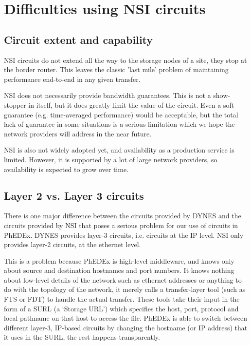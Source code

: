 \section{Difficulties using NSI circuits}

\subsection{Circuit extent and capability}
NSI circuits do not extend all the way to the storage nodes of a site, they stop at the border router. This leaves the classic 'last mile' problem of maintaining performance end-to-end in any given transfer.

NSI does not necessarily provide bandwidth guarantees. This is not a show-stopper in itself, but it does greatly limit the value of the circuit. Even a soft guarantee (e.g. time-averaged performance) would be acceptable\cite{BW_sharing}, but the total lack of guarantee in some situations is a serious limitation which we hope the network providers will address in the near future.

NSI is also not widely adopted yet, and availability as a production service is limited. However, it is supported by a lot of large network providers, so availability is expected to grow over time.

\subsection{Layer 2 vs. Layer 3 circuits}

There is one major difference between the circuits provided by DYNES and the circuits provided by NSI that poses a serious problem for our use of circuits in PhEDEx. DYNES provides layer-3 circuits, i.e. circuits at the IP level. NSI only provides layer-2 circuits, at the ethernet level.

This is a problem because PhEDEx is high-level middleware, and knows only about source and destination hostnames and port numbers. It knows nothing about low-level details of the network such as ethernet addresses or anything to do with the topology of the network, it merely calls a transfer-layer tool (such as FTS\cite{FTS} or FDT\cite{FDT}) to handle the actual transfer. These tools take their input in the form of a SURL (a `Storage URL') which specifies the host, port, protocol and local pathname on that host to access the file. PhEDEx is able to switch between different layer-3, IP-based circuits by changing the hostname (or IP address) that it uses in the SURL, the rest happens transparently.

